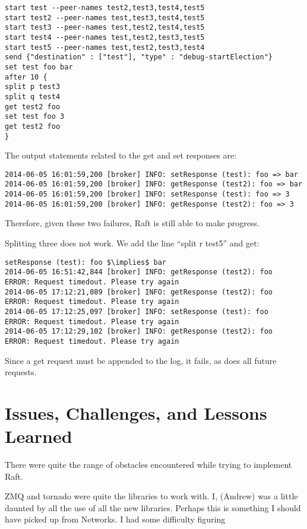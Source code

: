 \documentclass{article}
\begin{document}
\begin{verbatim}
start test --peer-names test2,test3,test4,test5
start test2 --peer-names test,test3,test4,test5
start test3 --peer-names test,test2,test4,test5
start test4 --peer-names test,test2,test3,test5
start test5 --peer-names test,test2,test3,test4
send {"destination" : ["test"], "type" : "debug-startElection"}
set test foo bar
after 10 {
split p test3
split q test4
get test2 foo
set test foo 3
get test2 foo 
}
\end{verbatim}

The output statements related to the get and set responses are:
\begin{verbatim}
2014-06-05 16:01:59,200 [broker] INFO: setResponse (test): foo => bar
2014-06-05 16:01:59,200 [broker] INFO: getResponse (test2): foo => bar
2014-06-05 16:01:59,200 [broker] INFO: setResponse (test): foo => 3
2014-06-05 16:01:59,200 [broker] INFO: getResponse (test2): foo => 3
\end{verbatim}

Therefore, given these two failures, Raft is still able to make progress.

Splitting three does not work. We add the line “split r test5” and get:

\begin{verbatim}
setResponse (test): foo $\implies$ bar
2014-06-05 16:51:42,844 [broker] INFO: getResponse (test2): foo
ERROR: Request timedout. Please try again
2014-06-05 17:12:21,089 [broker] INFO: getResponse (test2): foo
ERROR: Request timedout. Please try again
2014-06-05 17:12:25,097 [broker] INFO: setResponse (test): foo
ERROR: Request timedout. Please try again
2014-06-05 17:12:29,102 [broker] INFO: getResponse (test2): foo
ERROR: Request timedout. Please try again
\end{verbatim}

Since a get request must be appended to the log, it fails, as does all future requests.

\newpage

\section{Issues, Challenges, and Lessons Learned}

There were quite the range of obstacles encountered while trying to implement Raft.

ZMQ and tornado were quite the libraries to work with. I, (Andrew) was a little daunted by all the use of all the new libraries. Perhaps this is something I should have picked up from Networks. I had some difficulty figuring 
\end{document}
